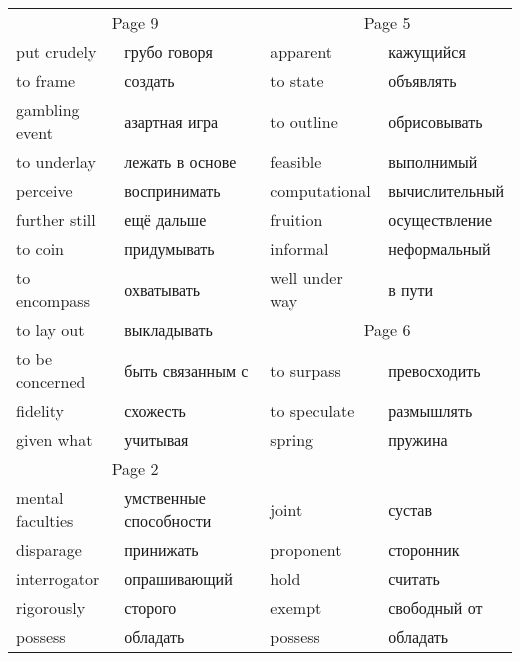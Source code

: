 \documentclass[12pt]{article}
\begin{document}
\begin{tabular}{| l l | l l | }
  \hline
  \multicolumn{2}{c|}{Page 9} & \multicolumn{2}{c|}{Page 5} \\
  put crudely & грубо говоря & apparent & кажущийся\\
  to frame & создать & to state & объявлять \\
  gambling event & азартная игра & to outline & обрисовывать \\
  to underlay & лежать в основе & feasible & выполнимый \\
  perceive & воспринимать & computational & вычислительный \\
  further still & ещё дальше & fruition & осуществление \\
  to coin & придумывать & informal & неформальный \\
  to encompass & охватывать & well under way & в пути \\ \cline{3-4}
  to lay out & выкладывать & \multicolumn{2}{c|}{Page 6} \\
  to be concerned & быть связанным с & to surpass & превосходить \\
  fidelity & схожесть & to speculate & размышлять \\
  given what & учитывая & spring & пружина \\ \cline{1-2}

  \multicolumn{2}{c|}{Page 2} \\
  mental faculties & умственные способности & joint & сустав \\
  disparage & принижать & proponent & сторонник \\
  interrogator & опрашивающий & hold & считать \\
  rigorously & сторого & exempt & свободный от \\
  possess & обладать & possess & обладать \\ \cline{1-2}


\end{tabular}
\end{document}
